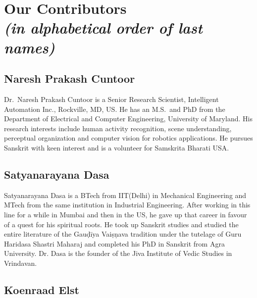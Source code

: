 \makeatletter
\def\@makeschapterhead#1{%
  \vspace*{50\p@}%
  {\parindent \z@ \raggedright
    \normalfont
    \interlinepenalty\@M
    \LARGE \bfseries  #1\par\nobreak
    \vskip 20\p@
  }}
\makeatother

\chapter*{Our Contributors\\ {\rm\sl\small (in alphabetical order of last names)}}\label{contributors}

\lhead[\small\thepage]{}
\rhead[]{\small\thepage}
\chead[]{}
\cfoot[]{}



\section*{Naresh Prakash Cuntoor}

Dr.~Naresh Prakash Cuntoor is a Senior Research Scientist, Intelligent Automation Inc., Rockville, MD, US\@. He has an M.S.\ and PhD from the Department of Electrical and Computer Engineering, University of Maryland. His research interests include human activity recognition, scene understanding, perceptual organization and computer vision for robotics applications. He pursues Sanskrit with keen interest and is a volunteer for Samskrita Bharati USA.

\section*{Satyanarayana Dasa}

Satyanarayana Dasa is a BTech from IIT(Delhi) in Mechanical Engineering and MTech from the same institution in Industrial Engineering. After working in this line for a while in Mumbai and then in the US, he gave up that career in favour of a quest for his spiritual roots. He took up Sanskrit studies and studied the entire literature of the Gauḍīya Vaiṣṇava tradition under the tutelage of Guru Haridasa Shastri Maharaj and completed his PhD in Sanskrit from Agra University. Dr. Dasa is the founder of the Jiva Institute of Vedic Studies in Vrindavan.

\section*{Koenraad Elst}

